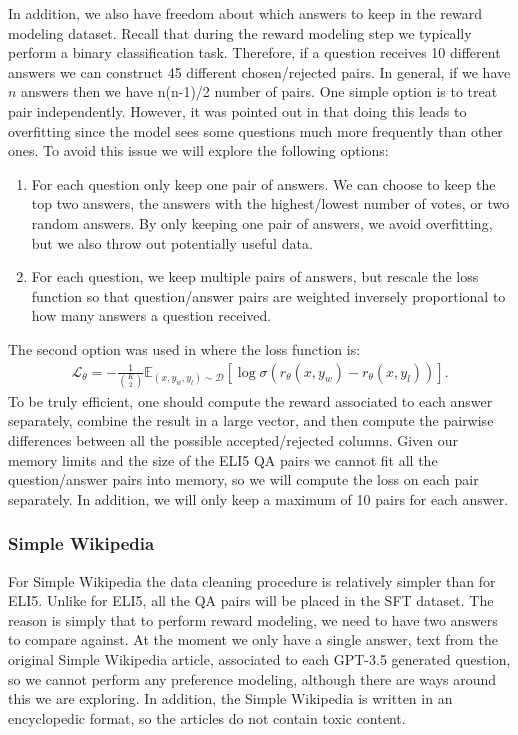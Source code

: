 \documentclass[11pt, oneside]{article}   	%
\begin{document}
In addition, we also have freedom about which answers to keep in the reward modeling dataset.
Recall that during the reward modeling step we typically perform a binary classification task.
Therefore, if a question receives 10 different answers we can construct 45 different chosen/rejected pairs. In general, if we have $n$ answers then we have n(n-1)/2 number of pairs. One simple option is to treat pair independently. 
However, it was pointed out in \cite{ouyang2022training} that doing this leads to overfitting since the model sees some questions much more frequently than other ones.
To avoid this issue we will explore the following options:
\begin{enumerate}
\item For each question only keep one pair of answers. We can choose to keep the top two answers, the answers with the highest/lowest number of votes, or two random answers.
By only keeping one pair of answers, we avoid overfitting, but we also throw out potentially useful data.
\item For each question, we keep multiple pairs of answers, but rescale the loss function so that question/answer pairs are weighted inversely proportional to how many answers a question received.
\end{enumerate}
The second option was used in \cite{ouyang2022training} where the loss function is:
\begin{align}
\mathcal{L}_{\theta}=-\frac{1}{{K\choose 2}}\mathbb{E}_{(x,y_w,y_l)\sim \mathcal{D}}\left[\log \sigma\left(r_{\theta}(x,y_w)-r_{\theta}(x,y_l)\right)\right].
\end{align}
To be truly efficient, one should compute the reward associated to each answer separately, combine the result in a large vector, and then compute the pairwise differences between all the possible accepted/rejected columns.
Given our memory limits and the size of the ELI5 QA pairs we cannot fit all the question/answer pairs into memory, so we will compute the loss on each pair separately.
In addition, we will only keep a maximum of 10 pairs for each answer.

\subsubsection{Simple Wikipedia}

For Simple Wikipedia the data cleaning procedure is relatively simpler than for ELI5.
Unlike for ELI5, all the QA pairs will be placed in the SFT dataset.
The reason is simply that to perform reward modeling, we need to have two answers to compare against.
At the moment we only have a single answer, text from the original Simple Wikipedia article, associated to each GPT-3.5 generated question, so we cannot perform any preference modeling, although there are ways around this we are exploring.
In addition, the Simple Wikipedia is written in an encyclopedic format, so the articles do not contain toxic content.
\end{document}
